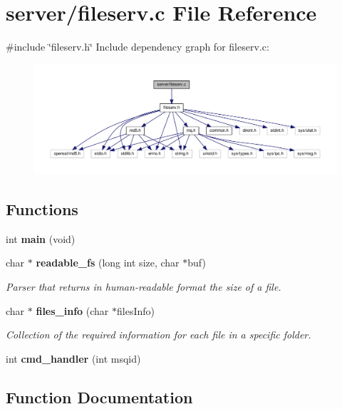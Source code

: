 \section{server/fileserv.c File Reference}
\label{fileserv_8c}
{\ttfamily \#include \char`\"{}fileserv.\+h\char`\"{}}\newline
Include dependency graph for fileserv.\+c\+:
\nopagebreak
\begin{figure}[H]
\begin{center}
\leavevmode
\includegraphics[width=350pt]{fileserv_8c__incl}
\end{center}
\end{figure}
\subsection*{Functions}
\begin{DoxyCompactItemize}
\item 
int \textbf{ main} (void)
\item 
char $\ast$ \textbf{ readable\+\_\+fs} (long int size, char $\ast$buf)
\begin{DoxyCompactList}\small\item\em Parser that returns in human-\/readable format the size of a file. \end{DoxyCompactList}\item 
char $\ast$ \textbf{ files\+\_\+info} (char $\ast$files\+Info)
\begin{DoxyCompactList}\small\item\em Collection of the required information for each file in a specific folder. \end{DoxyCompactList}\item 
int \textbf{ cmd\+\_\+handler} (int msqid)
\end{DoxyCompactItemize}


\subsection{Function Documentation}
\mbox{\label{fileserv_8c_a975d9337db509c0204b110f51d723160}} 
